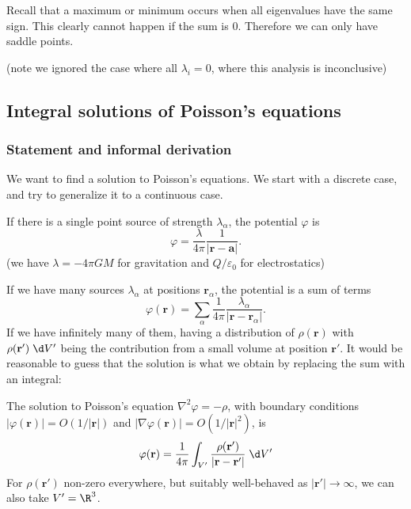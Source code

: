 \documentclass[a4paper]{article}
\begin{document}
Recall that a maximum or minimum occurs when all eigenvalues have the same sign. This clearly cannot happen if the sum is 0. Therefore we can only have saddle points.

(note we ignored the case where all $\lambda_i = 0$, where this analysis is inconclusive)
\subsection{Integral solutions of Poisson's equations}
\subsubsection{Statement and informal derivation}
We want to find a solution to Poisson's equations. We start with a discrete case, and try to generalize it to a continuous case.

If there is a single point source of strength $\lambda_\alpha$, the potential $\varphi$ is
\[
  \varphi = \frac{\lambda}{4\pi} \frac{1}{|\mathbf{r} - \mathbf{a}|}.
\]
(we have $\lambda = -4\pi GM$ for gravitation and $Q/\varepsilon_0$ for electrostatics)

If we have many sources $\lambda_\alpha$ at positions $\mathbf{r}_\alpha$, the potential is a sum of terms
\[
  \varphi(\mathbf{r}) = \sum_{\alpha} \frac{1}{4\pi}\frac{\lambda_\alpha}{|\mathbf{r} - \mathbf{r}_\alpha|}.
\]
If we have infinitely many of them, having a distribution of $\rho(\mathbf{r})$ with $\rho(\mathbf{r}')\;\d V'$ being the contribution from a small volume at position $\mathbf{r}'$. It would be reasonable to guess that the solution is what we obtain by replacing the sum with an integral:

\begin{prop}
  The solution to Poisson's equation $\nabla^2 \varphi = -\rho$, with boundary conditions $|\varphi (\mathbf{r})| = O(1/|\mathbf{r}|)$ and $|\nabla\varphi(\mathbf{r})| = O(1/|\mathbf{r}|^2)$, is 
  \[
    \varphi(\mathbf{r}) = \frac{1}{4\pi}\int_{V'} \frac{\rho(\mathbf{r}')}{|\mathbf{r} - \mathbf{r}'|}\;\d V'
  \]
  For $\rho(\mathbf{r}')$ non-zero everywhere, but suitably well-behaved as $|\mathbf{r}'| \to \infty$, we can also take $V' = \R^3$.
\end{prop}
\end{document}
